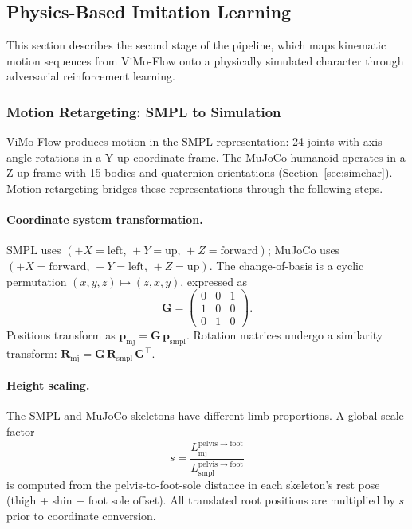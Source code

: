 \subsection{Physics-Based Imitation Learning}
\label{sec:physics}

This section describes the second stage of the pipeline, which maps kinematic motion sequences from ViMo-Flow onto a physically simulated character through adversarial reinforcement learning.


\subsubsection{Motion Retargeting: SMPL to Simulation}
\label{sec:retarget}

ViMo-Flow produces motion in the SMPL representation: 24 joints with axis-angle rotations in a Y-up coordinate frame. The MuJoCo humanoid operates in a Z-up frame with 15 bodies and quaternion orientations (Section~\ref{sec:simchar}). Motion retargeting bridges these representations through the following steps.

\paragraph{Coordinate system transformation.}
SMPL uses $(+X\!=\!\mathrm{left},\, +Y\!=\!\mathrm{up},\, +Z\!=\!\mathrm{forward})$; MuJoCo uses $(+X\!=\!\mathrm{forward},\, +Y\!=\!\mathrm{left},\, +Z\!=\!\mathrm{up})$. The change-of-basis is a cyclic permutation $(x,y,z) \mapsto (z,x,y)$, expressed as
\[
    \mathbf{G} = \begin{pmatrix} 0 & 0 & 1 \\ 1 & 0 & 0 \\ 0 & 1 & 0 \end{pmatrix}.
\]
Positions transform as $\mathbf{p}_{\mathrm{mj}} = \mathbf{G}\,\mathbf{p}_{\mathrm{smpl}}$. Rotation matrices undergo a similarity transform: $\mathbf{R}_{\mathrm{mj}} = \mathbf{G}\,\mathbf{R}_{\mathrm{smpl}}\,\mathbf{G}^\top$.

\paragraph{Height scaling.}
The SMPL and MuJoCo skeletons have different limb proportions. A global scale factor
\[
    s = \frac{L_{\mathrm{mj}}^{\mathrm{pelvis \to foot}}}{L_{\mathrm{smpl}}^{\mathrm{pelvis \to foot}}}
\]
is computed from the pelvis-to-foot-sole distance in each skeleton's rest pose (thigh + shin + foot sole offset). All translated root positions are multiplied by $s$ prior to coordinate conversion.

